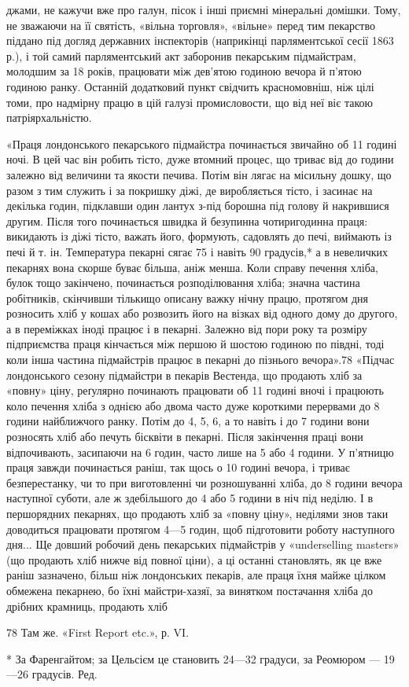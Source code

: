 джами, не кажучи вже про галун, пісок і інші приємні мінеральні
домішки. Тому, не зважаючи на її святість, «вільна торговля»,
«вільне» перед тим пекарство піддано під догляд державних
інспекторів (наприкінці парляментської сесії 1863 р.), і той самий
парляментський акт заборонив пекарським підмайстрам, молодшим
за 18 років, працювати між дев’ятою годиною вечора й п’ятою
годиною ранку. Останній додатковий пункт свідчить красномовніш,
ніж цілі томи, про надмірну працю в цій галузі промисловости,
що від неї віє такою патріярхальністю.

«Праця лондонського пекарського підмайстра починається
звичайно об 11 годині ночі. В цей час він робить тісто, дуже втомний
процес, що триває від  до  години залежно від величини
та якости печива. Потім він лягає на місильну дошку, що разом
з тим служить і за покришку діжі, де виробляється тісто, і засинає
на декілька годин, підклавши один лантух з-під борошна під
голову й накрившися другим. Після того починається швидка й
безупинна чотиригодинна праця: викидають із діжі тісто, важать
його, формують, садовлять до печі, виймають із печі й т. ін. Температура
пекарні сягає 75 і навіть 90 градусів,* а в невеличких пекарнях
вона скорше буває більша, аніж менша. Коли справу печення
хліба, булок тощо закінчено, починається розподілювання хліба;
значна частина робітників, скінчивши тількищо описану важку
нічну працю, протягом дня розносить хліб у кошах або розвозить
його на візках від одного дому до другого, а в переміжках іноді працює
і в пекарні. Залежно від пори року та розміру підприємства
праця кінчається між першою й шостою годиною по півдні, тоді коли
інша частина підмайстрів працює в пекарні до пізнього вечора».78
«Підчас лондонського сезону підмайстри в пекарів Вестенда, що
продають хліб за «повну» ціну, реґулярно починають працювати
об 11 годині вночі і працюють коло печення хліба з однією або
двома часто дуже короткими перервами до 8 години найближчого
ранку. Потім до 4, 5, 6, а то навіть і до 7 години вони розносять
хліб або печуть бісквіти в пекарні. Після закінчення праці вони
відпочивають, засипаючи на 6 годин, часто лише на 5 або 4 години.
У п’ятницю праця завжди починається раніш, так щось о 10 годині
вечора, і триває безперестанку, чи то при виготовленні чи розношуванні
хліба, до 8 години вечора наступної суботи, але ж здебільшого
до 4 або 5 години в ніч під неділю. І в першорядних
пекарнях, що продають хліб за «повну ціну», неділями знов таки
доводиться працювати протягом 4—5 годин, щоб підготовити
роботу наступного дня... Ще довший робочий день пекарських
підмайстрів у «underselling masters» (що продають хліб нижче
від повної ціни), а ці останні становлять, як це вже раніш зазначено,
більш ніж  лондонських пекарів, але праця їхня
майже цілком обмежена пекарнею, бо їхні майстри-хазяї, за
винятком постачання хліба до дрібних крамниць, продають хліб

78 Там же. «First Report etc.», р. VI.

* За Фаренгайтом; за Цельсієм це становить 24—32 градуси, за
Реомюром — 19—26 градусів. Ред.
